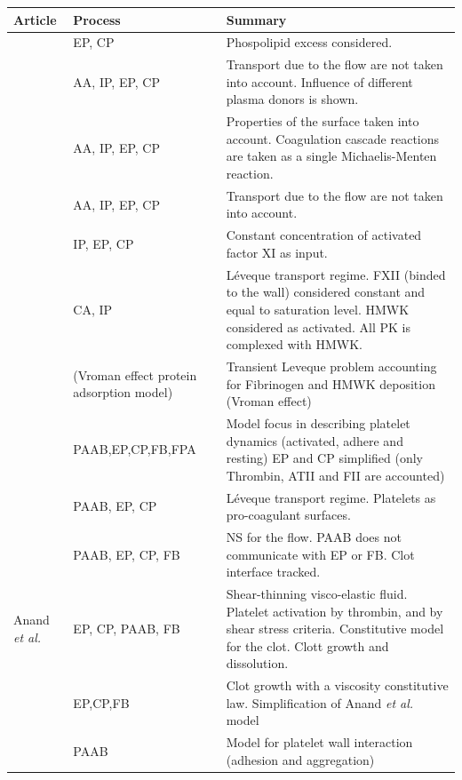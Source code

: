 \documentclass[%
 nofootinbib,
 amsmath,amssymb,
 aps,
 pra,
]{revtex4-1}
\begin{document}
\begin{table}[h]
\begin{tabular}{|p{5 cm} | p{3.5cm} | p{9.5 cm} |}
\hline
Article & Process & Summary\\
\hline
\citet{Jones:1994} & EP, CP & Phospolipid excess considered. \\
\hline
\citet{Chatterjee:2010} & AA, IP, EP, CP & Transport due to the flow are not taken into account. Influence of different plasma donors is shown.\\
\hline
\citet{Guo:2006} & AA, IP, EP, CP & Properties of the surface taken into account. Coagulation cascade reactions are taken as a single Michaelis-Menten reaction.\\
\hline
\citet{Kogan:2001} & AA, IP, EP, CP & Transport due to the flow are not taken into account.\\
\hline
\citet{Zarnitsina:1996} & IP, EP, CP & Constant concentration of activated factor XI as input.\\
\hline
\citet{Gregory:1994} & CA, IP & L\'{e}veque transport regime. FXII (binded to the wall) considered constant and equal to saturation level. HMWK considered as activated. All PK is complexed with HMWK.\\ 
\hline
\citet{Mandrusov:1998} & (Vroman effect protein adsorption model) & Transient Leveque problem accounting for Fibrinogen and HMWK deposition (Vroman effect)\\
\hline
\citet{Sorensen:1999} & PAAB,EP,CP,FB,FPA & Model focus in describing platelet dynamics (activated, adhere and resting) EP and CP simplified (only Thrombin, ATII and FII are accounted)\\
\hline
\citet{Kuharsky:2001} & PAAB, EP, CP & L\'{e}veque transport regime. Platelets as pro-coagulant surfaces. \\
\hline
\citet{Xu:2008} & PAAB, EP, CP, FB & NS for the flow. PAAB does not communicate with EP or FB. Clot interface tracked. \\
\hline
Anand \textit{et al.} \citep{Anand:2003, Anand:2006, Anand:2008} & EP, CP, PAAB, FB & Shear-thinning visco-elastic fluid. Platelet activation by thrombin, and by shear stress criteria. Constitutive model for the clot. Clott growth and dissolution. \\
\hline
\citet{Bodnar:2008} & EP,CP,FB & Clot growth with a viscosity constitutive law. Simplification of Anand \textit{et al.} model \\
\hline
\citet{Fogelson:2004} & PAAB & Model for platelet wall interaction (adhesion and aggregation) \\

\end{tabular}
\end{table}
\end{document}
